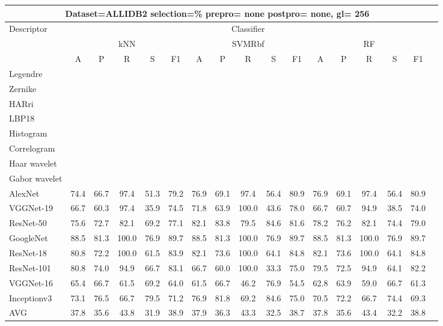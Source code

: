 \documentclass[12pt,italian]{article}
\begin{document}
\begin{tiny}
 \pagebreak 
\begin{longtable}{lcccccccccccccccc}
\toprule
\multicolumn{16}{c}{Dataset=ALLIDB2 selection=\% prepro= none postpro= none, gl= 256} \\ 
\toprule
Descriptor & \multicolumn{15}{c}{Classifier} \\ 
& \multicolumn{5}{c}{kNN} & \multicolumn{5}{c}{SVMRbf} & \multicolumn{5}{c}{RF} \\ 
& A & P & R & S & F1 & A & P & R & S & F1 & A & P & R & S & F1 \\ 
\midrule
Legendre \\ 
Zernike \\ 
HARri \\ 
LBP18 \\ 
Histogram \\ 
Correlogram \\ 
Haar wavelet \\ 
Gabor wavelet \\ 
AlexNet & 74.4 & 66.7 & 97.4 & 51.3 & 79.2 & 76.9 & 69.1 & 97.4 & 56.4 & 80.9 & 76.9 & 69.1 & 97.4 & 56.4 & 80.9 \\ 
VGGNet-19 & 66.7 & 60.3 & 97.4 & 35.9 & 74.5 & 71.8 & 63.9 & 100.0 & 43.6 & 78.0 & 66.7 & 60.7 & 94.9 & 38.5 & 74.0 \\ 
ResNet-50 & 75.6 & 72.7 & 82.1 & 69.2 & 77.1 & 82.1 & 83.8 & 79.5 & 84.6 & 81.6 & 78.2 & 76.2 & 82.1 & 74.4 & 79.0 \\ 
GoogleNet & 88.5 & 81.3 & 100.0 & 76.9 & 89.7 & 88.5 & 81.3 & 100.0 & 76.9 & 89.7 & 88.5 & 81.3 & 100.0 & 76.9 & 89.7 \\ 
ResNet-18 & 80.8 & 72.2 & 100.0 & 61.5 & 83.9 & 82.1 & 73.6 & 100.0 & 64.1 & 84.8 & 82.1 & 73.6 & 100.0 & 64.1 & 84.8 \\ 
ResNet-101 & 80.8 & 74.0 & 94.9 & 66.7 & 83.1 & 66.7 & 60.0 & 100.0 & 33.3 & 75.0 & 79.5 & 72.5 & 94.9 & 64.1 & 82.2 \\ 
VGGNet-16 & 65.4 & 66.7 & 61.5 & 69.2 & 64.0 & 61.5 & 66.7 & 46.2 & 76.9 & 54.5 & 62.8 & 63.9 & 59.0 & 66.7 & 61.3 \\ 
Inceptionv3 & 73.1 & 76.5 & 66.7 & 79.5 & 71.2 & 76.9 & 81.8 & 69.2 & 84.6 & 75.0 & 70.5 & 72.2 & 66.7 & 74.4 & 69.3 \\ 
\hline
AVG & 37.8 & 35.6 & 43.8 & 31.9 & 38.9 & 37.9 & 36.3 & 43.3 & 32.5 & 38.7 & 37.8 & 35.6 & 43.4 & 32.2 & 38.8 \\ 
\hline
\bottomrule
\end{longtable} 

 \pagebreak 
\end{tiny} 
 
\end{document}
